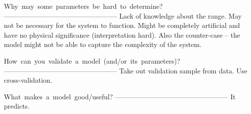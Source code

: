 Why may some parameters be hard to determine?
--------------------------------------------------
Lack of knowledge about the range. May not be necessary for the system to function. Might be 
completely artificial and have no physical significance (interpretation hard). Also the 
counter-case -- the model might not be able to capture the complexity of the system.

How can you validate a model (and/or its parameters)?
--------------------------------------------------
Take out validation sample from data. Use cross-validation.  

What makes a model good/useful?
--------------------------------------------------
It predicts. 
